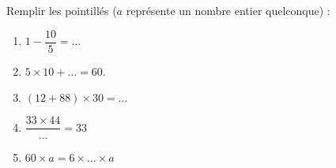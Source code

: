 
\begin{exercice}\label{exosmath-0889}

    Remplir les pointillés (\( a\) représente un nombre entier quelconque) :
    \begin{multicols}{2}
        \begin{enumerate}
            \item
                \( 1-\dfrac{ 10 }{ 5 }=\ldots\)
            \item
                \( 5\times 10+\ldots=60\).
            \item
                \( (12+88)\times 30=\ldots\)
            \item
                \( \dfrac{ 33\times 44 }{ \ldots }=33\)
            \item
                \( 60\times a=6\times \ldots\times a\)
        \end{enumerate}
    \end{multicols}

\end{exercice}
